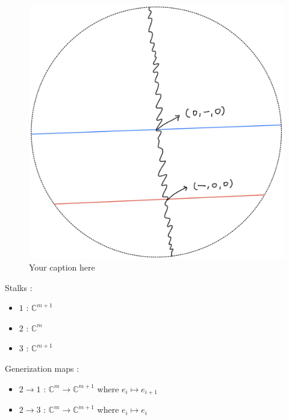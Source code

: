 \begin{figure}[H] %
    \centering
    \includegraphics[scale = 0.95]{diagrams/lemma1/3.png} %
    \caption{Your caption here}
    \label{fig:your-label}
\end{figure}
Stalks :
\begin{itemize}
\item $1$ : $\mathbb{C}^{m+1}$
\item $2$ : $\mathbb{C}^{m}$
\item $3$ : $\mathbb{C}^{m+1}$
\end{itemize}
Generization maps :
\begin{itemize}
\item $2\rightarrow 1$ : $\mathbb{C}^{m}\rightarrow \mathbb{C}^{m+1}$ where $e_i\mapsto e_{i+1}$
\item $2\rightarrow 3$ : $\mathbb{C}^{m}\rightarrow \mathbb{C}^{m+1}$ where $e_i\mapsto e_{i}$
\end{itemize}

